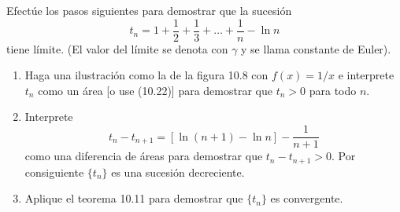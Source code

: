 \item Efectúe los pasos siguientes para demostrar que la sucesión
    \[ t_n = 1 + \frac{1}{2} + \frac{1}{3} + \dots + \frac{1}{n} - \ln n \]
    tiene límite. (El valor del límite se denota con $\gamma$ y se llama constante de Euler).
    \begin{enumerate}
        \item[(a)] Haga una ilustración como la de la figura 10.8 con $f(x) = 1/x$ e interprete $t_n$ como un área [o use (10.22)] para demostrar que $t_n > 0$ para todo $n$.
        \item[(b)] Interprete
        \[ t_n - t_{n+1} = [\ln(n + 1) - \ln n] - \frac{1}{n + 1} \]
        como una diferencia de áreas para demostrar que $t_n - t_{n+1} > 0$. Por consiguiente $\{t_n\}$ es una sucesión decreciente.
        \item[(c)] Aplique el teorema 10.11 para demostrar que $\{t_n\}$ es convergente.
    \end{enumerate}
